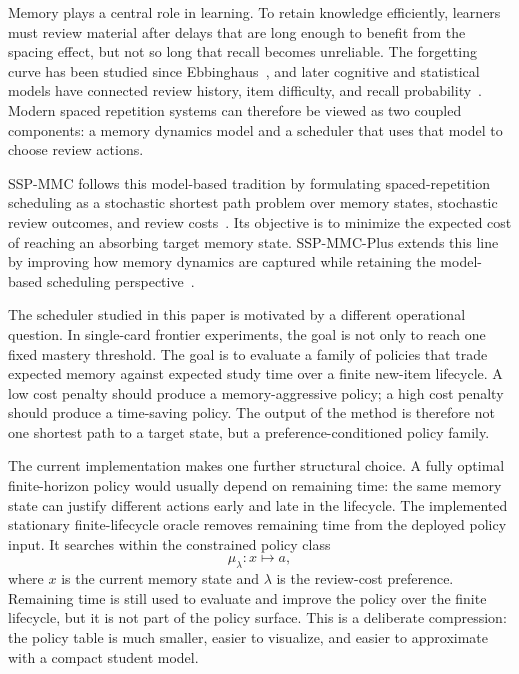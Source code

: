 \documentclass[11pt]{article}
\begin{document}
Memory plays a central role in learning. To retain knowledge efficiently, learners must review material after delays that are long enough to benefit from the spacing effect, but not so long that recall becomes unreliable. The forgetting curve has been studied since Ebbinghaus~\citep{ebbinghaus1913memory}, and later cognitive and statistical models have connected review history, item difficulty, and recall probability~\citep{anderson1998atomic,pavlik2008using,settles2016trainable}. Modern spaced repetition systems can therefore be viewed as two coupled components: a memory dynamics model and a scheduler that uses that model to choose review actions.

SSP-MMC follows this model-based tradition by formulating spaced-repetition scheduling as a stochastic shortest path problem over memory states, stochastic review outcomes, and review costs~\citep{ye2022stochastic}. Its objective is to minimize the expected cost of reaching an absorbing target memory state. SSP-MMC-Plus extends this line by improving how memory dynamics are captured while retaining the model-based scheduling perspective~\citep{su2023optimizing}.

The scheduler studied in this paper is motivated by a different operational question. In single-card frontier experiments, the goal is not only to reach one fixed mastery threshold. The goal is to evaluate a family of policies that trade expected memory against expected study time over a finite new-item lifecycle. A low cost penalty should produce a memory-aggressive policy; a high cost penalty should produce a time-saving policy. The output of the method is therefore not one shortest path to a target state, but a preference-conditioned policy family.

The current implementation makes one further structural choice. A fully optimal finite-horizon policy would usually depend on remaining time: the same memory state can justify different actions early and late in the lifecycle. The implemented stationary finite-lifecycle oracle removes remaining time from the deployed policy input. It searches within the constrained policy class
\[
\mu_\lambda: x \mapsto a,
\]
where \(x\) is the current memory state and \(\lambda\) is the review-cost preference. Remaining time is still used to evaluate and improve the policy over the finite lifecycle, but it is not part of the policy surface. This is a deliberate compression: the policy table is much smaller, easier to visualize, and easier to approximate with a compact student model.
\end{document}

